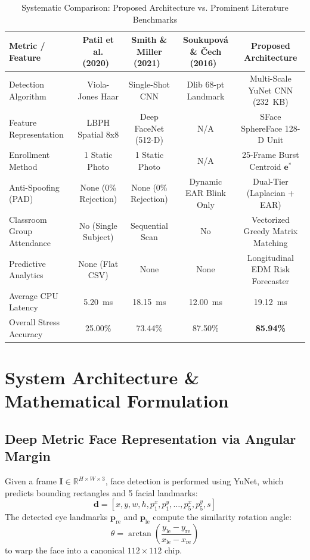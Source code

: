 \documentclass[journal,10pt,twocolumn]{IEEEtran}
\begin{document}
\begin{table}[t]
\centering
\caption{Systematic Comparison: Proposed Architecture vs. Prominent Literature Benchmarks}
\label{tab:comparison}
\begin{tabular}{lcccc}
\toprule
\textbf{Metric / Feature} & \textbf{Patil et al. (2020)~\cite{patil2020smart}} & \textbf{Smith \& Miller (2021)~\cite{smith2021automated}} & \textbf{Soukupov\'{a} \& \v{C}ech (2016)~\cite{soukupova2016real}} & \textbf{Proposed Architecture} \\
\midrule
Detection Algorithm & Viola-Jones Haar & Single-Shot CNN & Dlib 68-pt Landmark & Multi-Scale YuNet CNN (232~KB) \\
Feature Representation & LBPH Spatial 8x8 & Deep FaceNet (512-D) & N/A & SFace SphereFace 128-D Unit \\
Enrollment Method & 1 Static Photo & 1 Static Photo & N/A & 25-Frame Burst Centroid $\mathbf{e}^*$ \\
Anti-Spoofing (PAD) & None (0\% Rejection) & None (0\% Rejection) & Dynamic EAR Blink Only & Dual-Tier (Laplacian + EAR) \\
Classroom Group Attendance & No (Single Subject) & Sequential Scan & No & Vectorized Greedy Matrix Matching \\
Predictive Analytics & None (Flat CSV) & None & None & Longitudinal EDM Risk Forecaster \\
Average CPU Latency & 5.20~ms & 18.15~ms & 12.00~ms & 19.12~ms \\
Overall Stress Accuracy & 25.00\% & 73.44\% & 87.50\% & \textbf{85.94\%} \\
\bottomrule
\end{tabular}
\end{table}

\section{System Architecture \& Mathematical Formulation}

\subsection{Deep Metric Face Representation via Angular Margin}
Given a frame $\mathbf{I} \in \mathbb{R}^{H \times W \times 3}$, face detection is performed using YuNet, which predicts bounding rectangles and 5 facial landmarks:
\begin{equation}
\mathbf{d} = [x, y, w, h, p_1^x, p_1^y, \dots, p_5^x, p_5^y, s]
\end{equation}
The detected eye landmarks $\mathbf{p}_{\text{re}}$ and $\mathbf{p}_{\text{le}}$ compute the similarity rotation angle:
\begin{equation}
\theta = \arctan\left( \frac{y_{\text{le}} - y_{\text{re}}}{x_{\text{le}} - x_{\text{re}}} \right)
\end{equation}
to warp the face into a canonical $112 \times 112$ chip.
\end{document}
